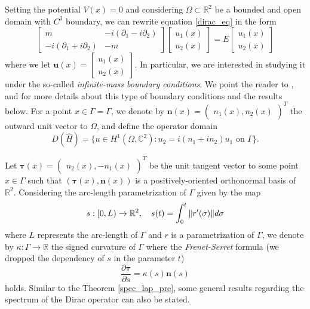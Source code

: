 Setting the potential \(V(x)=0\) and considering \(\Omega \subset \mathbb{R}^2\) be a bounded and open domain with \(C^3\) boundary, we can rewrite equation \eqref{dirac_eq} in the form    
\begin{equation}\label{dirac}
    \begin{bmatrix}
        m & -i(\partial_1 - i \partial_2)\\
        -i(\partial_1 + i \partial_2) & -m
    \end{bmatrix}
    \begin{bmatrix}
        u_1(x)\\
        u_2(x)
    \end{bmatrix}
    =E
    \begin{bmatrix}
    u_1(x)\\
    u_2(x)
    \end{bmatrix}
\end{equation}
where we let \(\mathbf{u}(x)=\begin{bmatrix}
    u_1(x)\\
    u_2(x)
    \end{bmatrix}\).
In particular, we are interested in studying it under the so-called \textit{infinite-mass boundary conditions}. We point the reader to \cite{lotoreichik2019sharp}, \cite{briet2022spectral} and \cite{antunes2021variational} for more details about this type of boundary conditions and the results below. For a point \(x \in \Gamma = \Gamma\), we denote by \(\mathbf{n}(x) = \begin{pmatrix}
    n_1(x), n_2(x)
\end{pmatrix}^T\) the outward unit vector to \(\Omega\), and define the operator domain
\[
D(\hat{H}) = \{u \in H^1(\Omega, \mathbb{C}^2): u_2 = i(n_1+i n_2)u_1 \text{ on } \Gamma\}.
\]

Let \(\mathbf{\tau}(x) = \begin{pmatrix}
    n_2(x), -n_1(x)
\end{pmatrix}^T\) be the unit tangent vector to some point \(x \in \Gamma\) such that \((\mathbf{\tau}(x), \mathbf{n}(x))\) is a positively-oriented orthonormal basis of \(\mathbb{R}^2\). Considering the arc-length parametrization of \(\Gamma\) given by the map
\[
s: [0, L) \rightarrow \mathbb{R}^2, \quad s(t) = \int_0^t \norm{r'(\sigma)} d\sigma
\]
where \(L\) represents the arc-length of \(\Gamma\) and \(r\) is a parametrization of \(\Gamma\), we denote by \(\kappa:\Gamma \rightarrow \mathbb{R}\) the signed curvature of \(\Gamma\) where the \textit{Frenet-Serret} formula (we dropped the dependency of \(s\) in the parameter \(t\))
\[
    \frac{\partial\mathbf{\tau}}{\partial s}=\kappa(s)\mathbf{n}(s)
\]
holds. Similar to the Theorem \eqref{spec_lap_pre}, some general results regarding the spectrum of the Dirac operator can also be stated.

